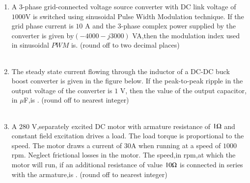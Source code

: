 \documentclass[journal]{IEEEtran}
\begin{document}
\begin {enumerate}
\item A 3-phase grid-connected voltage source converter with DC link voltage of $1000$V
is switched using sinusoidal Pulse Width Modulation technique. If the grid phase current is $10$ A and the 3-phase complex power supplied by the converter is given by$(-4000-j3000)$ VA,then the modulation index used in sinusoidal $PWM$ is\underline{\hspace{2cm}}. (round off to two decimal places) \\ \\
\item The steady state current flowing through the inductor of a DC-DC buck boost converter is given in the figure below. If the peak-to-peak ripple in the output voltage of the converter is $1$ V, then the value of the output capacitor, in $\mu$F,is \underline{\hspace{2cm}}. (round off to nearest integer) \\ \\ 

\begin{figure}[!ht]
\centering
{}%

\end{figure}

\item A $280$ V,separately excited DC motor with armature resistance of $1\ohm$  and constant field excitation drives a load. The load torque is proportional to the speed. The motor draws a current of $30$A when running at a speed of $1000$rpm. Neglect frictional losses in the motor. The speed,in rpm,at which the motor will run, if an additional resistance of value $10\ohm$ is connected in series with the armature,is \underline{\hspace{2cm}}. (round off to nearest integer) \\ \\ \\



\end{enumerate}
\end{document}

